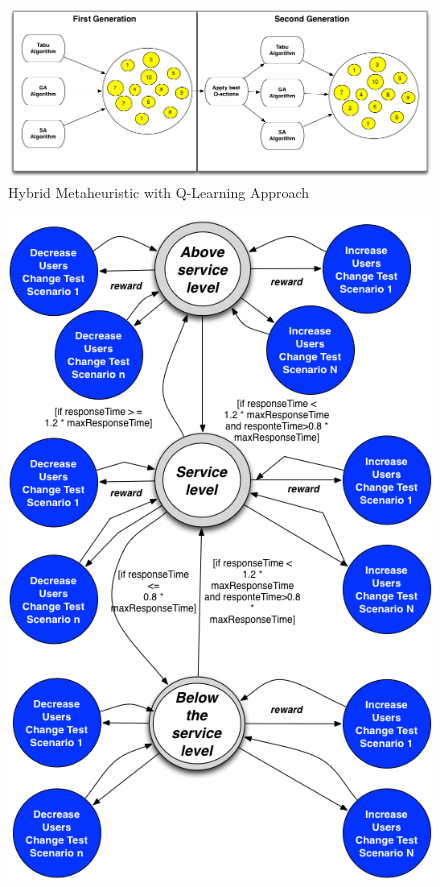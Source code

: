 \documentclass{bmcart}
\begin{document}
\begin{backmatter}
\begin{figure}[h!]
\center
\includegraphics{./images/qhybrid.png}
\caption{Hybrid Metaheuristic with Q-Learning Approach}
\label{fig:hybridq}
\end{figure}

\begin{figure}[h!]
\begin{minipage}{.5\textwidth}
\center
\includegraphics{./images/mdp3.png}

\end{minipage}
\end{figure}
\end{backmatter}
\end{document}
